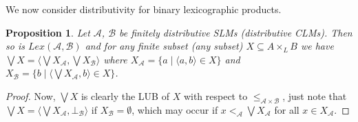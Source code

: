 \documentclass[a4paper]{elsarticle}
\newtheorem{proposition}{Proposition}
\newcommand{\1}{\mathbf{1}}
\begin{document}
We now consider distributivity for binary lexicographic products.

\begin{proposition}\label{def:lexBI}
Let $\mathcal{A}$, $\mathcal{B}$ be finitely distributive SLMs (distributive CLMs).
Then so is $Lex(\mathcal{A}, \mathcal{B})$ and for any finite subset (any subset) $X \subseteq A \times_L B$ 
we have $\bigvee X = \langle \bigvee X_\mathcal{A}, \bigvee X_\mathcal{B} \rangle$ 
where $X_\mathcal{A} = \{ a \mid \langle a, b \rangle \in X\}$
and $X_\mathcal{B} = \{ b \mid \langle \bigvee X_\mathcal{A}, b \rangle \in X\}$.
\end{proposition}
\begin{proof}
	Now, $\bigvee X$ is clearly the LUB of $X$ with respect to $\leq_{\mathcal{A} \times \mathcal{B}}$,
	just note that $\bigvee X =  \langle \bigvee X_\mathcal{A}, \bot_\mathcal{B} \rangle$ if 
	$X_\mathcal{B} = \emptyset$, which may occur if $x <_\mathcal{A} \bigvee X_\mathcal{A}$ for all 
	$x \in X_\mathcal{A}$.


\end{proof}
\end{document}
